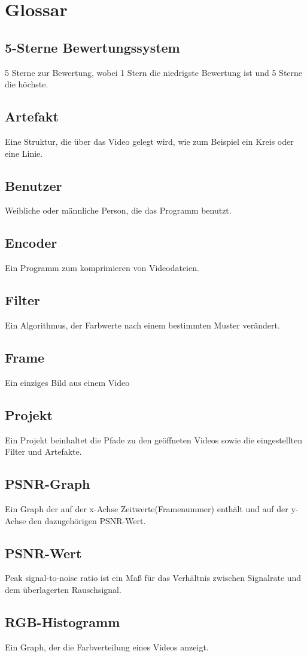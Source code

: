\documentclass[parskip=full]{scrartcl}
\begin{document}
\section{Glossar}
\subsection*{5-Sterne Bewertungssystem}  
5 Sterne zur Bewertung, wobei 1 Stern die niedrigste Bewertung ist und 5 Sterne die höchste.

\subsection*{Artefakt} Eine Struktur, die über das Video gelegt wird, wie zum Beispiel ein Kreis oder eine Linie.
\subsection*{Benutzer} 
Weibliche oder männliche Person, die das Programm benutzt.
\subsection*{Encoder} 
Ein Programm zum komprimieren von Videodateien.
\subsection*{Filter} 
Ein Algorithmus, der Farbwerte nach einem bestimmten Muster verändert.
\subsection*{Frame}
Ein einziges Bild aus einem Video
\subsection*{Projekt} 
Ein Projekt beinhaltet die Pfade zu den geöffneten Videos sowie die eingestellten Filter und Artefakte.
\subsection*{PSNR-Graph} 
Ein Graph der auf der x-Achse Zeitwerte(Framenummer) enthält und auf der y-Achse den dazugehörigen PSNR-Wert.
\subsection*{PSNR-Wert} 
Peak signal-to-noise ratio ist ein Maß für das Verhältnis zwischen Signalrate und dem überlagerten Rauschsignal.
\subsection*{RGB-Histogramm} 
Ein Graph, der die Farbverteilung eines Videos anzeigt.
\end{document}
